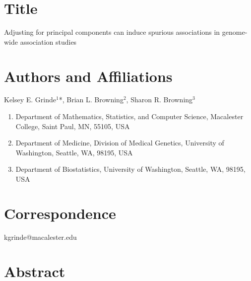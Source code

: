 \documentclass[12pt]{article}
\begin{document}
\section{Title}

Adjusting for principal components can induce spurious %
associations in genome-wide association studies 

\section{Authors and Affiliations}

Kelsey E. Grinde$^{1}$*, %
Brian L. Browning$^{2}$, 
Sharon R. Browning$^{3}$

\begin{enumerate}
\item Department of Mathematics, Statistics, and Computer Science, Macalester College, Saint Paul, MN, 55105, USA
\item Department of Medicine, Division of Medical Genetics, University of Washington, Seattle, WA, 98195, USA
\item Department of Biostatistics, University of Washington, Seattle, WA, 98195, USA
\end{enumerate}

\section{Correspondence}

kgrinde@macalester.edu

\section{Abstract}

\end{document}
